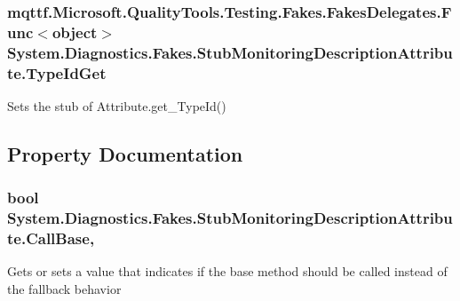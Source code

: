 \hypertarget{class_system_1_1_diagnostics_1_1_fakes_1_1_stub_monitoring_description_attribute_ac106b30cfff1fadf7dfb642256693e58}{
\subsubsection[{Type\-Id\-Get}]{\setlength{\rightskip}{0pt plus 5cm}mqttf.\-Microsoft.\-Quality\-Tools.\-Testing.\-Fakes.\-Fakes\-Delegates.\-Func$<$object$>$ System.\-Diagnostics.\-Fakes.\-Stub\-Monitoring\-Description\-Attribute.\-Type\-Id\-Get}}\label{class_system_1_1_diagnostics_1_1_fakes_1_1_stub_monitoring_description_attribute_ac106b30cfff1fadf7dfb642256693e58}


Sets the stub of Attribute.\-get\-\_\-\-Type\-Id()



\subsection{Property Documentation}
\hypertarget{class_system_1_1_diagnostics_1_1_fakes_1_1_stub_monitoring_description_attribute_a59751ba7b04732ea2f6210bac338ebb1}{
\subsubsection[{Call\-Base}]{\setlength{\rightskip}{0pt plus 5cm}bool System.\-Diagnostics.\-Fakes.\-Stub\-Monitoring\-Description\-Attribute.\-Call\-Base\hspace{0.3cm}{\ttfamily [get]}, {\ttfamily [set]}}}\label{class_system_1_1_diagnostics_1_1_fakes_1_1_stub_monitoring_description_attribute_a59751ba7b04732ea2f6210bac338ebb1}


Gets or sets a value that indicates if the base method should be called instead of the fallback behavior

